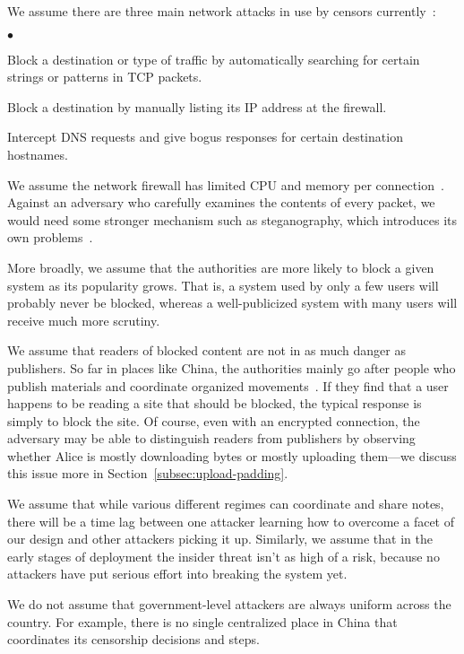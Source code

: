 \documentclass{llncs}
\newenvironment{tightlist}{\begin{list}{$\bullet$}{
  \setlength{\itemsep}{0mm}
    \setlength{\parsep}{0mm}
    }}{\end{list}}
\begin{document}
We assume there are three main network attacks in use by censors
currently~\cite{clayton:pet2006}:

\begin{tightlist}
\item Block a destination or type of traffic by automatically searching for
  certain strings or patterns in TCP packets.
\item Block a destination by manually listing its IP address at the
firewall.
\item Intercept DNS requests and give bogus responses for certain
destination hostnames.
\end{tightlist}

We assume the network firewall has limited CPU and memory per
connection~\cite{clayton:pet2006}. Against an adversary who carefully
examines the contents of every packet, we would need
some stronger mechanism such as steganography, which introduces its
own problems~\cite{active-wardens,tcpstego,bar}.

More broadly, we assume that the authorities are more likely to
block a given system as its popularity grows. That is, a system
used by only a few users will probably never be blocked, whereas a
well-publicized system with many users will receive much more scrutiny.

We assume that readers of blocked content are not in as much danger
as publishers. So far in places like China, the authorities mainly go
after people who publish materials and coordinate organized
movements~\cite{mackinnon}.
If they find that a user happens
to be reading a site that should be blocked, the typical response is
simply to block the site. Of course, even with an encrypted connection,
the adversary may be able to distinguish readers from publishers by
observing whether Alice is mostly downloading bytes or mostly uploading
them---we discuss this issue more in Section~\ref{subsec:upload-padding}.

We assume that while various different regimes can coordinate and share
notes, there will be a time lag between one attacker learning
how to overcome a facet of our design and other attackers picking it up.
Similarly, we assume that in the early stages of deployment the insider
threat isn't as high of a risk, because no attackers have put serious
effort into breaking the system yet.

We do not assume that government-level attackers are always uniform across
the country. For example, there is no single centralized place in China
that coordinates its censorship decisions and steps.
\end{document}
